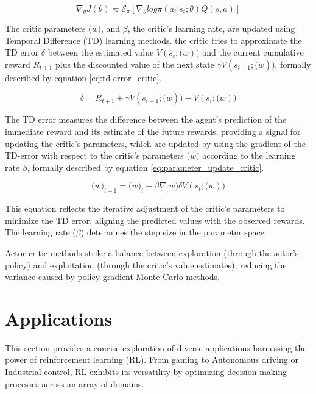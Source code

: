 \begin{equation}
    \label{eq:gradient_actor_critic}
    \nabla_\theta J(\theta) \eqsim \mathcal{E}_\pi[\nabla_\theta log \pi(a_t|s_t;\theta)Q(s,a)]
\end{equation}

The critic parameters $\mathcal(w)$, and $\beta$, the critic's learning rate, are updated using Temporal Difference (TD) learning methods. the critic tries to approximate the TD error $\delta$ between the estimated value $V(s_t;\mathcal(w))$ and the current cumulative reward $R_{t+1}$ plus the discounted value of the next state $\gamma V(s_{t+1};\mathcal(w))$, formally described by equation \ref{eq:td-error_critic}.

\begin{equation}
    \label{eq:td-error_critic}
    \delta = R_{t+1} + \gamma V(s_{t+1};\mathcal(w)) - V(s_t;\mathcal(w))
\end{equation}

The TD error measures the difference between the agent's prediction of the immediate reward and its estimate of the future rewards, providing a signal for updating the critic's parameters, which are updated by using the gradient of the TD-error with respect to the critic's parameters $\mathcal(w)$ according to the learning rate $\beta$, formally described by equation \ref{eq:parameter_update_critic}.

\begin{equation}
    \label{eq:parameter_update_critic}
    \mathcal(w)_{t+1} = \mathcal(w)_t + \beta \nabla_\mathcal(w) \delta V(s_t;\mathcal(w))
\end{equation}

This equation reflects the iterative adjustment of the critic's parameters to minimize the TD error, aligning the predicted values with the observed rewards. The learning rate ($\beta$) determines the step size in the parameter space.

Actor-critic methods strike a balance between exploration (through the actor's policy) and exploitation (through the critic's value estimates), reducing the variance caused by policy gradient Monte Carlo methods.

\section{Applications}\label{sec:rl-applications}
This section provides a concise exploration of diverse applications harnessing the power of reinforcement learning (RL). From gaming to Autonomous driving or Industrial control, RL exhibits its versatility by optimizing decision-making processes across an array of domains.

